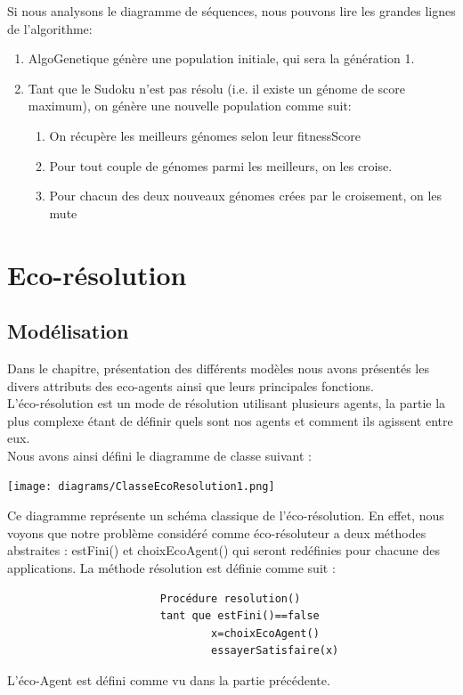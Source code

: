                 Si nous analysons le diagramme de séquences, nous pouvons lire les grandes lignes de l'algorithme:
                \begin{enumerate}
                    \item AlgoGenetique génère une population initiale, qui sera la génération 1.
                    \item Tant que le Sudoku n'est pas résolu (i.e. il existe un génome de score maximum), on génère une nouvelle population comme suit:
                        \begin{enumerate}
                            \item On récupère les meilleurs génomes selon leur fitnessScore
                            \item Pour tout couple de génomes parmi les meilleurs, on les croise.
                            \item Pour chacun des deux nouveaux génomes crées par le croisement, on les mute
                        \end{enumerate}
                \end{enumerate}
    \section{Eco-résolution}
        \subsection{Modélisation}
            Dans le chapitre, présentation des différents modèles nous avons présentés les divers attributs des eco-agents ainsi que leurs principales fonctions. \\
            L'éco-résolution est un mode de résolution utilisant plusieurs agents, la partie la plus complexe étant de définir quels sont nos agents et comment ils agissent entre eux. \\
            Nous avons ainsi défini le diagramme de classe suivant : \\
            \begin{center}
                \texttt{[image: diagrams/ClasseEcoResolution1.png]}
            \end{center} 
			
			Ce diagramme représente un schéma classique de l'éco-résolution. En effet, nous voyons que notre problème considéré comme éco-résoluteur a deux méthodes abstraites : estFini() et choixEcoAgent() qui seront redéfinies pour chacune des applications. 
			La méthode résolution est définie comme suit : 
					\begin{verbatim}
                        Procédure resolution() 
						tant que estFini()==false                        
                        		x=choixEcoAgent()
                        		essayerSatisfaire(x)
                    \end{verbatim}
            L'éco-Agent est défini comme vu dans la partie précédente.
                    
